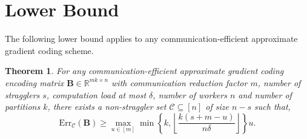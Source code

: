 \documentclass[journal,draftcls,onecolumn]{IEEEtran}
\theoremstyle{mystyle}
\newtheorem{thm}{Theorem}
\newcommand{\floor}[1]{\left\lfloor #1\right\rfloor}
\newcommand{\aditya}[1]{\marginpar{+}{\bf Aditya's remark}: {\em #1}}
\newcommand{\sifat}[1]{\marginpar{+}{\bf Sifat's remark}: {\em #1}}
\begin{document}
\section{Lower Bound}
The following lower bound applies to any communication-efficient approximate gradient coding scheme. 
\begin{thm}
\label{thm:lowerbound}
For any communication-efficient approximate gradient coding encoding matrix $\mathbf{B} \in \mathbb{R}^{mk \times n}$ with communication reduction factor $m$, number of stragglers $s$, computation load at most $\delta$, number of workers $n$ and number of partitions $k$, there exists a non-straggler set $\mathcal{C} \subseteq [n]$ of size $n-s$ such that,
\begin{equation}\label{eq:lowerbound}
\text{Err}_{\mathcal{C}}(\mathbf{B})  
\ge \max_{u \in [m]} \min \left\{k,{\floor{\frac{k(s+m-u)}{n\delta}}} \right \}u.
\end{equation}


\end{thm}
\end{document}
